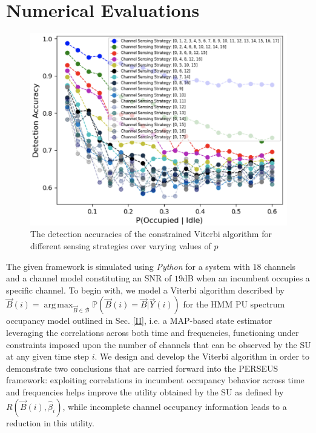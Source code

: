 \documentclass[10pt,twocolumn]{IEEEtran}
\DeclareMathOperator*{\argmax}{arg\,max}
\begin{document}
\section{Numerical Evaluations}\label{IV}
\begin{figure}
    \centering
    \includegraphics[width=1.0\linewidth]{ViterbiDetectionAccuracies.png}
    \caption{The detection accuracies of the constrained Viterbi algorithm for different sensing strategies over varying values of $p$}
    \vspace{-5mm}
    \label{fig:2}
\end{figure}

The given framework is simulated using \emph{Python} for a system with $18$ channels and a channel model constituting an SNR of $19$dB when an incumbent occupies a specific channel. To begin with, we model a Viterbi algorithm described by $\vec{B}(i){=}\argmax_{\vec{B}{\in}\mathcal{B}} \mathbb{P}(\vec{B}(i){=}\vec{B}|\vec{Y}(i))$ for the HMM PU spectrum occupancy model outlined in Sec. \ref{II}, i.e. a MAP-based state estimator leveraging the correlations across both time and frequencies, functioning under constraints imposed upon the number of channels that can be observed by the SU at any given time step $i$. We design and develop the Viterbi algorithm in order to demonstrate two conclusions that are carried forward into the PERSEUS framework: exploiting correlations in incumbent occupancy behavior across time and frequencies helps improve the utility obtained by the SU as defined by $R(\vec{B}(i), \hat{\beta}_{i})$, while incomplete channel occupancy information leads to a reduction in this utility. 
\end{document}
